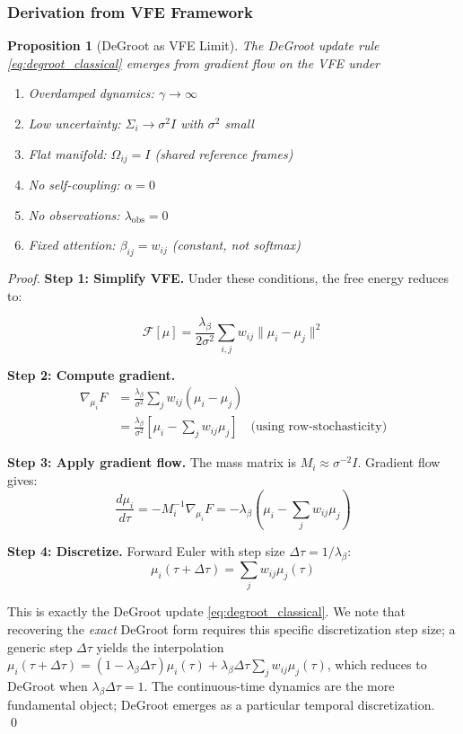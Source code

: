 \documentclass[12pt]{article}
\newtheorem{proposition}[theorem]{Proposition}
\begin{document}
\subsubsection{Derivation from VFE Framework}

\begin{proposition}[DeGroot as VFE Limit]
The DeGroot update rule \eqref{eq:degroot_classical} emerges from gradient flow on the VFE under

\begin{enumerate}[label=(\roman*)]
\item Overdamped dynamics: $\gamma \to \infty$
\item Low uncertainty: $\Sigma_i \to \sigma^2 I$ with $\sigma^2$ small
\item Flat manifold: $\Omega_{ij} = I$ (shared reference frames)
\item No self-coupling: $\alpha = 0$
\item No observations: $\lambda_{\text{obs}} = 0$
\item Fixed attention: $\beta_{ij} = w_{ij}$ (constant, not softmax)
\end{enumerate}
\end{proposition}

\begin{proof}
\textbf{Step 1: Simplify VFE.}
Under these conditions, the free energy reduces to:

\begin{equation}
\mathcal{F}[\mu] = \frac{\lambda_\beta}{2\sigma^2} \sum_{i,j} w_{ij} \|\mu_i - \mu_j\|^2
\end{equation}

\textbf{Step 2: Compute gradient.}
\begin{align}
\nabla_{\mu_i} F &= \frac{\lambda_\beta}{\sigma^2} \sum_j w_{ij} (\mu_i - \mu_j) \\
&= \frac{\lambda_\beta}{\sigma^2} \left[\mu_i - \sum_j w_{ij} \mu_j\right] \quad \text{(using row-stochasticity)}
\end{align}

\textbf{Step 3: Apply gradient flow.}
The mass matrix is $M_i \approx \sigma^{-2} I$. Gradient flow gives:
\begin{equation}
\frac{d\mu_i}{d\tau} = -M_i^{-1}\nabla_{\mu_i} F = -\lambda_\beta\left(\mu_i - \sum_j w_{ij}\mu_j\right)
\end{equation}

\textbf{Step 4: Discretize.}
Forward Euler with step size $\Delta\tau = 1/\lambda_\beta$:
\begin{equation}
\mu_i(\tau + \Delta\tau) = \sum_j w_{ij}\mu_j(\tau)
\end{equation}

This is exactly the DeGroot update \eqref{eq:degroot_classical}. We note that recovering the \emph{exact} DeGroot form requires this specific discretization step size; a generic step $\Delta\tau$ yields the interpolation $\mu_i(\tau + \Delta\tau) = (1 - \lambda_\beta\Delta\tau)\mu_i(\tau) + \lambda_\beta\Delta\tau\sum_j w_{ij}\mu_j(\tau)$, which reduces to DeGroot when $\lambda_\beta\Delta\tau = 1$. The continuous-time dynamics are the more fundamental object; DeGroot emerges as a particular temporal discretization. \qed
\end{proof}
\end{document}
